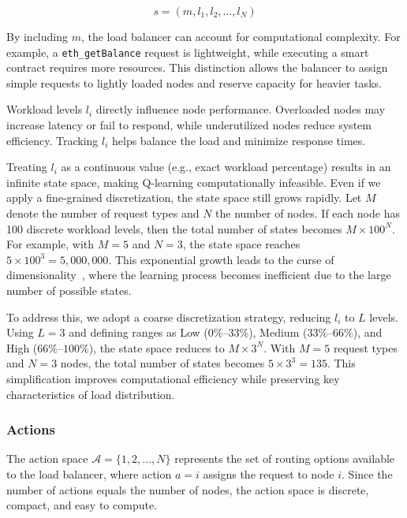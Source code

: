 \documentclass[lnbip]{svmultln}
\begin{document}
\begin{equation}
s = (m, l_1, l_2, \ldots, l_N)
\label{eq:state-definition}
\end{equation}

By including $m$, the load balancer can account for computational complexity. For example, a \texttt{eth\_getBalance} request is lightweight, while executing a smart contract requires more resources. This distinction allows the balancer to assign simple requests to lightly loaded nodes and reserve capacity for heavier tasks.

Workload levels $l_i$ directly influence node performance. Overloaded nodes may increase latency or fail to respond, while underutilized nodes reduce system efficiency. Tracking $l_i$ helps balance the load and minimize response times.

Treating $l_i$ as a continuous value (e.g., exact workload percentage) results in an infinite state space, making Q-learning computationally infeasible. Even if we apply a fine-grained discretization, the state space still grows rapidly. Let $M$ denote the number of request types and $N$ the number of nodes. If each node has 100 discrete workload levels, then the total number of states becomes $M \times 100^N$. For example, with $M = 5$ and $N = 3$, the state space reaches $5 \times 100^3 = 5{,}000{,}000$. This exponential growth leads to the curse of dimensionality~\cite{bellman1957}, where the learning process becomes inefficient due to the large number of possible states.

To address this, we adopt a coarse discretization strategy, reducing $l_i$ to $L$ levels. Using $L = 3$ and defining ranges as Low ($0\%$–$33\%$), Medium ($33\%$–$66\%$), and High ($66\%$–$100\%$), the state space reduces to $M \times 3^N$. With $M = 5$ request types and $N = 3$ nodes, the total number of states becomes $5 \times 3^3 = 135$. This simplification improves computational efficiency while preserving key characteristics of load distribution.


\subsubsection{Actions}\label{s:3.3.2}

The action space $\mathcal{A} = \{1, 2, \ldots, N\}$ represents the set of routing options available to the load balancer, where action $a = i$ assigns the request to node $i$. Since the number of actions equals the number of nodes, the action space is discrete, compact, and easy to compute.
\end{document}
